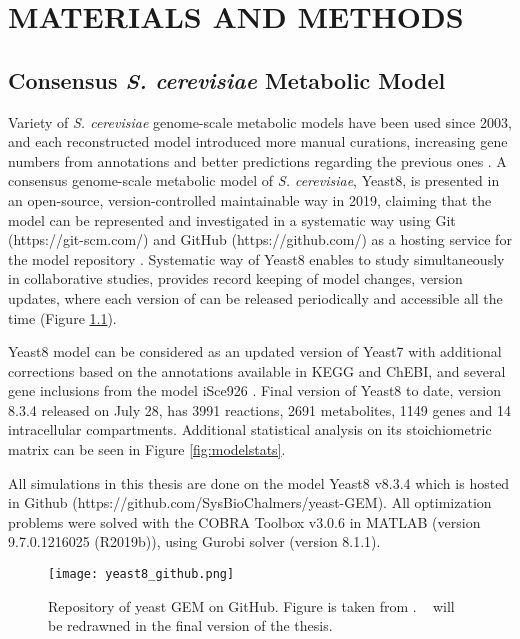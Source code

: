 \chapter{MATERIALS AND METHODS}

\section{Consensus \emph{S. cerevisiae} Metabolic Model}
Variety of \emph{S. cerevisiae} genome-scale metabolic models have been used since 2003, and each reconstructed model introduced more manual curations, increasing gene numbers from annotations and better predictions regarding the previous ones \cite{lopes2017genome}. A consensus genome-scale metabolic model of \emph{S. cerevisiae}, Yeast8, is presented in an open-source, version-controlled maintainable way in 2019, claiming that the model can be represented and investigated in a systematic way using Git (https://git-scm.com/) and GitHub (https://github.com/) as a hosting service for the model repository \cite{lu2019consensus}. Systematic way of Yeast8 enables to study simultaneously in collaborative studies, provides record keeping of model changes, version updates, where each version of can be released periodically and accessible all the time (Figure \ref{fig:yeast8_github}).

Yeast8 model can be considered as an updated version of Yeast7 \cite{aung2013revising} with additional corrections based on the annotations available in KEGG and ChEBI, and several gene inclusions from the model iSce926 \cite{chowdhury2015using}. Final version of Yeast8 to date, version 8.3.4 released on July 28, has 3991 reactions, 2691 metabolites, 1149 genes and 14 intracellular compartments. Additional statistical analysis on its stoichiometric matrix can be seen in Figure \ref{fig:modelstats}.

All simulations in this thesis are done on the model Yeast8 v8.3.4 which is hosted in Github (https://github.com/SysBioChalmers/yeast-GEM). All optimization problems were solved with the COBRA Toolbox v3.0.6 in MATLAB (version 9.7.0.1216025 (R2019b)), using Gurobi solver (version 8.1.1).

\begin{figure}[H]
\begin{center}
\texttt{[image: yeast8\_github.png]}
\end{center}
\caption[Repository of yeast GEM on GitHub]{Repository of yeast GEM on GitHub. Figure is taken from \cite{lu2019consensus}. ~ will be redrawned in the final version of the thesis.}
\label{fig:yeast8_github}
\end{figure}

